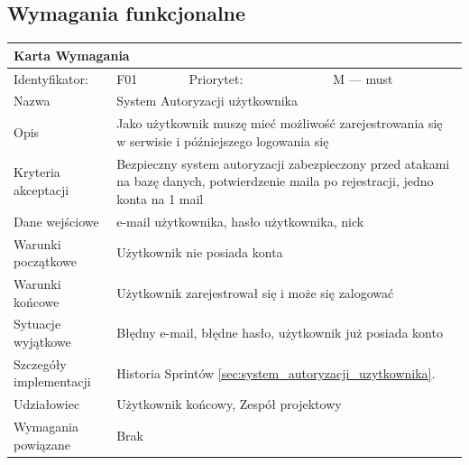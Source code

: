 \documentclass[a4paper,11pt]{report}
\begin{document}
	\subsection {Wymagania funkcjonalne}
		\begin{tabular}{|p{3cm}|p{2cm}|p{2cm}|p{6cm}|}
		\hline
		\multicolumn{4}{|p{12 cm}|}{Karta Wymagania}\\
		\hline
		Identyfikator: & F01 & Priorytet: & M — must\\
		\hline
		Nazwa & \multicolumn{3}{|p{10 cm}|}{System Autoryzacji użytkownika}\\
		\hline
		Opis & \multicolumn{3}{|p{10 cm}|}{Jako użytkownik muszę mieć możliwość zarejestrowania się w serwisie i późniejszego logowania się}\\
		\hline
		Kryteria akceptacji & \multicolumn{3}{|p{10 cm}|}{Bezpieczny system autoryzacji zabezpieczony przed atakami na bazę danych, potwierdzenie maila po rejestracji,  jedno konta na 1 mail}\\
		\hline
		Dane wejściowe & \multicolumn{3}{|p{10 cm}|}{e-mail użytkownika, hasło użytkownika, nick}\\
		\hline
		Warunki początkowe & \multicolumn{3}{|p{10 cm}|}{Użytkownik nie posiada konta}\\
		\hline
		Warunki końcowe & \multicolumn{3}{|p{10 cm}|}{Użytkownik zarejestrował się i może się zalogować}\\
		\hline
		Sytuacje wyjątkowe & \multicolumn{3}{|p{10 cm}|}{Błędny e-mail, błędne hasło, użytkownik już posiada konto}\\
		\hline
		Szczegóły implementacji & \multicolumn{3}{|p{10 cm}|}{Historia Sprintów \ref{sec:system_autoryzacji_uzytkownika}.}\\
		\hline
		Udziałowiec & \multicolumn{3}{|p{10 cm}|}{Użytkownik końcowy, Zespół projektowy}\\
		\hline
		Wymagania powiązane & \multicolumn{3}{|p{10 cm}|}{Brak}\\
		\hline
		\end{tabular}\\
		\newline
		\vspace*{0,2 cm}
		\newline
\end{document}
